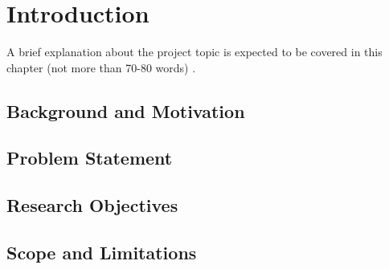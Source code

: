 \chapter{Introduction}
A brief explanation about the project topic is expected to be covered in this chapter (not more than 70-80 words) \cite{chen2021,einstein1905,johnson2018}.
	
\section{Background and Motivation}



\section{Problem Statement}



\section{Research Objectives}



\section{Scope and Limitations}
